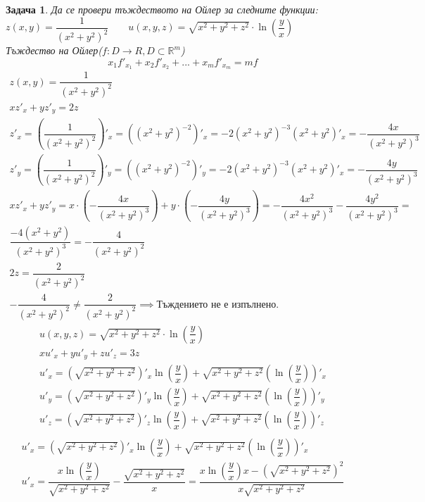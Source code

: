 \documentclass[a4paper,fleqn,12pt]{article}
\newtheorem{task}{Задача}[section]
\begin{document}
\begin{task}
Да се провери тъждеството на Ойлер за следните функции:
$z(x,y) = \dfrac{1}{(x^2+y^2)^2}\qquad u(x,y,z) = \sqrt{x^2+y^2+z^2}\cdot \ln{\left( \dfrac{y}{x}\right)}$\\
Тъждество на Ойлер($f:D \to R, D\subset \mathbb{R}^m$)
$$x_1f'_{x_1} + x_2f'_{x_2} + ... +x_mf'_{x_m} = mf$$
\begin{gather*}
z(x,y) = \dfrac{1}{(x^2+y^2)^2} \\
xz'_x +yz'_y = 2z \\
z'_x = \left( \dfrac{1}{(x^2+y^2)^2}\right)'_x = \left((x^2+y^2)^{-2}\right)'_x = -2(x^2+y^2)^{-3}(x^2+y^2)'_x =-\dfrac{4x}{(x^2+y^2)^3}\\
z'_y = \left( \dfrac{1}{(x^2+y^2)^2}\right)'_y = \left((x^2+y^2)^{-2}\right)'_y = -2(x^2+y^2)^{-3}(x^2+y^2)'_x =-\dfrac{4y}{(x^2+y^2)^3}\\
xz'_x +yz'_y = x \cdot \left( - \dfrac{4x}{(x^2+y^2)^3} \right)+ y \cdot \left( - \dfrac{4y}{(x^2+y^2)^3}\right) = -\dfrac{4x^2}{(x^2+y^2)^3} - \dfrac{4y^2}{(x^2+y^2)^3} = \\
\dfrac{-4(x^2+y^2)}{(x^2+y^2)^3} = -\dfrac{4}{(x^2+y^2)^2}\\
2z = \dfrac{2}{(x^2+y^2)^2}\\
-\dfrac{4}{(x^2+y^2)^2} \neq  \dfrac{2}{(x^2+y^2)^2} \implies \text{Тъждението не е изпълнено.}
\end{gather*}
\begin{gather*}
u(x,y,z) = \sqrt{x^2+y^2+z^2}\cdot \ln{\left( \dfrac{y}{x}\right)}\\
xu'_x + yu'_y + zu'_z = 3z \\
u'_x = \left(\sqrt{x^2+y^2+z^2}\right)'_x \ln{\left( \dfrac{y}{x}\right)} + \sqrt{x^2+y^2+z^2}\left( \ln{\left( \dfrac{y}{x}\right)}\right)'_x \\
u'_y = \left(\sqrt{x^2+y^2+z^2}\right)'_y \ln{\left( \dfrac{y}{x}\right)} + \sqrt{x^2+y^2+z^2}\left( \ln{\left( \dfrac{y}{x}\right)}\right)'_y \\
u'_z = \left(\sqrt{x^2+y^2+z^2}\right)'_z\ln{\left( \dfrac{y}{x}\right)} + \sqrt{x^2+y^2+z^2}\left( \ln{\left( \dfrac{y}{x}\right)}\right)'_z \\
\end{gather*}
\begin{gather*}
u'_x = \left(\sqrt{x^2+y^2+z^2}\right)'_x \ln{\left( \dfrac{y}{x}\right)} + \sqrt{x^2+y^2+z^2}\left( \ln{\left( \dfrac{y}{x}\right)}\right)'_x \\
u'_x = \dfrac{x\ln{\left( \dfrac{y}{x}\right)}}{\sqrt{x^2+y^2+z^2}} - \dfrac{\sqrt{x^2+y^2+z^2}}{x} = \dfrac{x\ln{\left( \dfrac{y}{x}\right)}x - \left(\sqrt{x^2+y^2+z^2}\right)^2}{x\sqrt{x^2+y^2+z^2}}\\

\end{gather*}
\end{task}
\end{document}
